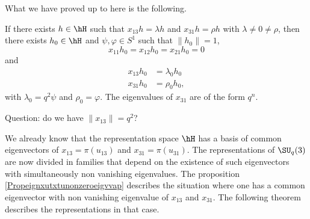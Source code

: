 What we have proved up to here is the following.
\begin{proposition}     \label{Propeignxutxtunonzeroeigvvap}
    If there exists \( h\in\hH\) such that \( x_{13}h=\lambda h\) and \( x_{31}h=\rho h\) with \( \lambda\neq 0\neq \rho\), then there exists \( h_0\in\hH\) and \( \psi,\varphi\in S^1\) such that \( \| h_0\|=1 \),
    \begin{equation}
        x_{11}h_0=x_{12}h_0=x_{21}h_0=0
    \end{equation}
    and
    \begin{subequations}
        \begin{align}
            x_{13}h_0&=\lambda_0h_0\\
            x_{31}h_0&=\rho_0 h_0,
        \end{align}
    \end{subequations}
    with \( \lambda_0=q^2\psi\) and \( \rho_0=\varphi\). The eigenvalues of \( x_{31}\) are of the form \( q^n\).
\end{proposition}

\begin{probleme}
    Question: do we have \( \| x_{13} \|=q^2\)?
\end{probleme}

We already know that the representation space \( \hH\) has a basis of common eigenvectors of \( x_{13}=\pi(u_{13})\) and \( x_{31}=\pi(u_{31})\). The representations of \( \SU_q(3)\) are now divided in families that depend on the existence of such eigenvectors with simultaneously non vanishing eigenvalues. The proposition \ref{Propeignxutxtunonzeroeigvvap} describes the situation where one has a common eigenvector with non vanishing eigenvalue of \( x_{13}\) and \( x_{31}\). The following theorem describes the representations in that case.

